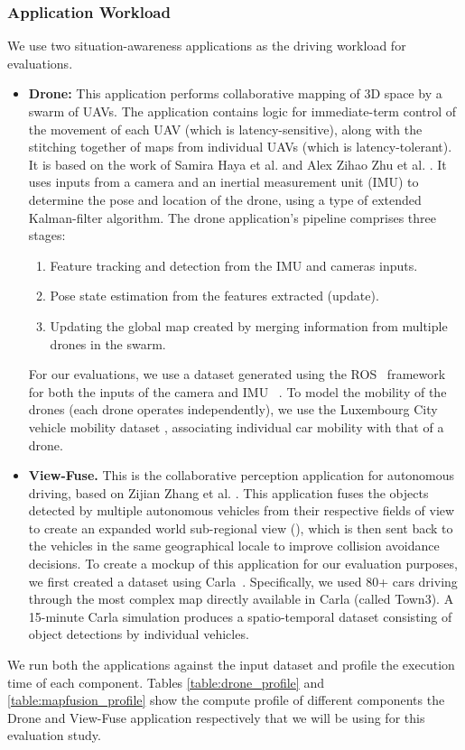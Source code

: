 \subsubsection{Application Workload}
We use two situation-awareness applications as the driving workload for evaluations. 
\begin{itemize}
\item \textbf{Drone: } This application performs collaborative mapping of 3D space by a swarm of UAVs. The application contains logic for immediate-term control of the movement of each UAV (which is latency-sensitive), along with the stitching together of maps from individual UAVs (which is latency-tolerant). It is based on the work of Samira Haya et al. \cite{dronenavi} and Alex Zihao Zhu et al. \cite{dronenavi1}. It uses inputs from a camera and an inertial measurement unit (IMU) to determine the pose and location of the drone, using a type of extended Kalman-filter algorithm. The drone application's pipeline comprises three stages: 
\begin{enumerate}
\item Feature tracking and detection from the IMU and cameras inputs.
\item Pose state estimation from the features extracted (update).
\item Updating the global map created by merging information from multiple drones in the swarm.
\end{enumerate}
For our evaluations, we use a dataset generated using the ROS~\cite{ros} framework for both the inputs of the camera and IMU ~\cite{dronedataset}. To model the mobility of the drones (each drone operates independently), we use the Luxembourg City vehicle mobility dataset \cite{lust}, associating individual car mobility with that of a drone. 

\item \textbf{View-Fuse.} This is the collaborative perception application for autonomous driving, based on Zijian Zhang et al. \cite{mapfusionimpl}. This application fuses the objects detected by multiple autonomous vehicles from their respective fields of view to create an expanded world sub-regional view (), which is then sent back to the vehicles in the same geographical locale to improve collision avoidance decisions. To create a mockup of this application for our evaluation purposes, we first created a dataset using Carla~\cite{carlasim}. Specifically, we used 80+ cars driving through the most complex map directly available in Carla (called Town3). A 15-minute Carla simulation produces a spatio-temporal dataset consisting of object detections by individual vehicles. 
\end{itemize}
We run both the applications against the input dataset and profile the execution time of each component. Tables \cref{table:drone_profile} and \cref{table:mapfusion_profile} show the compute profile of different components the Drone and View-Fuse application respectively that we will be using for this evaluation study.

